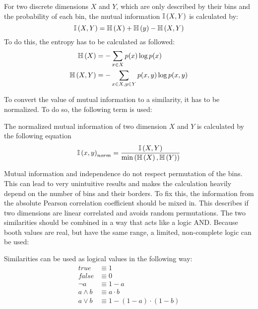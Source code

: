 \begin{envdef}
	For two discrete dimensions $X$ and $Y$, which are only described by their bins and the probability of each bin, the mutual information $\mathbb{I}\left(X,Y\right)$ is calculated by:
	\begin{equation}
		\mathbb{I}\left(X,Y\right) = \mathbb{H}\left(X\right) + \mathbb{H}\left(y\right) - \mathbb{H}\left(X,Y\right)
	\end{equation}
	To do this, the entropy has to be calculated as followed:
	\begin{align}
		\mathbb{H}\left(X\right) &= - \sum_{x \in X} p(x) \log{p(x)}\\
		\mathbb{H}\left(X,Y\right) &= - \sum_{x \in X, y \in Y} p(x,y) \log{p(x,y)}
	\end{align}
\end{envdef}

To convert the value of mutual information to a similarity, it has to be normalized. To do so, the following term is used:

\begin{envdef}
	The normalized mutual information of two dimension $X$ and $Y$ is calculated by the following equation
	\begin{equation}
		\mathbb{I}\left(x,y\right)_{norm} = \frac{\mathbb{I}\left(X,Y\right)}{\min{\left( \mathbb{H}\left(X\right), \mathbb{H}\left(Y\right) \right)}}
	\end{equation}
\end{envdef}

Mutual information and independence do not respect permutation of the bins. This can lead to very unintuitive results and makes the calculation heavily depend on the number of bins and their borders. To fix this, the information from the absolute Pearson correlation coefficient should be mixed in. This describes if two dimensions are linear correlated and avoids random permutations. The two similarities should be combined in a way that acts like a logic AND. Because booth values are real, but have the same range, a limited, non-complete logic can be used:

\begin{envdef}
	Similarities can be used as logical values in the following way:
	\begin{align}
		true &\equiv 1\\
		false &\equiv 0\\
		\neg a &\equiv 1 - a\\
		a \wedge b &\equiv a \cdot b\\
		a \vee b &\equiv 1 - (1 - a) \cdot (1 - b)
	\end{align}
\end{envdef}

